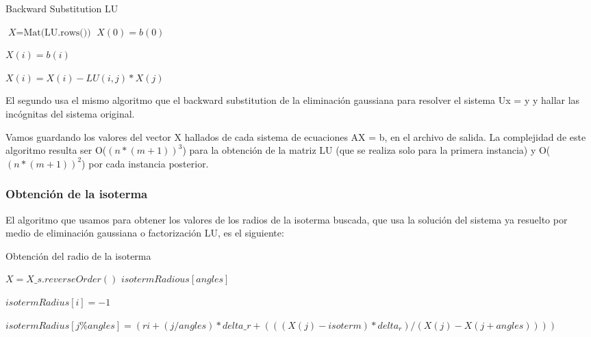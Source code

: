 \begin{algorithm}
\caption{Backward Substitution LU}\label{euclid}
\begin{algorithmic}[1]


    \State $\textit{X} = \text{Mat(LU.rows())}$
    \State $X(0) = b(0)$

      \State $X(i) = b(i)$

        \State $X(i) = X(i) - LU(i,j)*X(j)$
      \EndFor

    \EndFor
      
  \EndFunction

\end{algorithmic}
\end{algorithm}

El segundo usa el mismo algoritmo que el backward substitution de la eliminación gaussiana para resolver el sistema Ux = y y hallar las incógnitas del sistema original. 

Vamos guardando los valores del vector X hallados de cada sistema de ecuaciones AX = b, en el archivo de salida. La complejidad de este algoritmo resulta ser O($(n*(m+1))^{3}$) para la obtención de la matriz LU (que se realiza solo para la primera instancia) y O($(n*(m+1))^{2}$)
por cada instancia posterior.


\subsubsection{Obtención de la isoterma}

El algoritmo que usamos para obtener los valores de los radios de la isoterma buscada, que usa la solución del sistema ya resuelto por medio de eliminación gaussiana o factorización LU, es el siguiente:

\begin{algorithm}
\caption{Obtención del radio de la isoterma}\label{euclid}
\begin{algorithmic}[1]


    \State $X = X\_s.reverseOrder()$
    \State $isotermRadious[angles]$

      \State $isotermRadius[i] = -1$
    \EndFor

       \State $isotermRadius[j \% angles] = (ri + (j / angles)*delta\_r + (((X(j) - isoterm) * delta_r)/ (X(j) - X(j+angles)) ))$
      \EndIf
    \EndFor

  \EndFunction

\end{algorithmic}
\end{algorithm}

